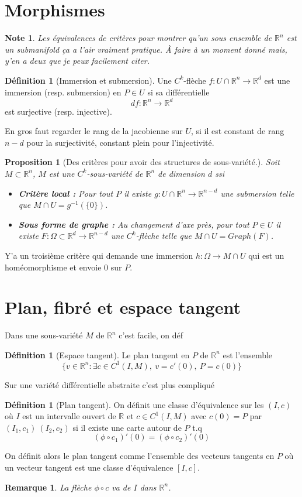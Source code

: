 \documentclass[a4paper,12pt]{book}
\newcommand{\R}{\mathbb{R}}
\theoremstyle{plain}
\newtheorem{prop}[subsection]{Proposition}
\newtheorem{rem}{Remarque}
\newtheorem{note}{Note}
\theoremstyle{definition}
\newtheorem{defn}[subsection]{Définition}
\theoremstyle{remark}
\begin{document}
\section{Morphismes}
\begin{note}
    Les équivalences de critères pour montrer qu'un sous ensemble de 
    $\R^n$ est un submanifold ça a l'air vraiment pratique. À faire
    à un moment donné mais, y'en a deux que je peux facilement 
    citer.
\end{note}
\begin{defn}[Immersion et submersion]
    Une $C^k$-flèche $f\colon U\cap \R^n\to \R^d$ est une immersion
    (resp. submersion) en $P\in U$ si sa différentielle 
    \[df\colon \R^n\to \R^d\]
    est surjective (resp. injective).
\end{defn}
En gros faut regarder le rang de la jacobienne sur $U$, si il est 
constant de rang $n-d$ pour la surjectivité, constant plein pour
l'injectivité.
\begin{prop}[Des critères pour avoir des structures de sous-variété.]
    Soit $M\subset \R^n$, $M$ est une $C^k$-sous-variété de $\R^n$
    de dimension $d$ ssi
    \begin{itemize}
        \item \textbf{Critère local :} Pour tout $P$ il existe
            $g\colon U\cap\R^n\to \R^{n-d}$ une submersion telle que 
            $M\cap U=g^{-1}(\{0\})$.
        \item \textbf{Sous forme de graphe :} Au changement d'axe près,
            pour tout $P\in U$ il existe 
            $F\colon \Omega\subset \R^d\to \R^{n-d}$ une 
            $C^k$-flèche telle que $M\cap U=Graph(F)$.
    \end{itemize}
\end{prop}
Y'a un troisième critère qui demande une immersion 
$h\colon \Omega\to M\cap U$ qui est un homéomorphisme et envoie $0$ sur 
$P$.

\section{Plan, fibré et espace tangent}
Dans une sous-variété $M$ de $\R^n$ c'est facile, on déf
\begin{defn}[Espace tangent]
    Le plan tangent en $P$ de $\R^n$ est l'ensemble 
    \[\{v\in\R^n : \exists c\in C^1(I,M),~v=c'(0),~P=c(0)\}\]
\end{defn}
Sur une variété différentielle abstraite c'est plus compliqué
\begin{defn}[Plan tangent]
    On définit une classe d'équivalence sur les $(I,c)$ où 
    $I$ est un intervalle ouvert de $\R$ et $c\in C^1(I,M)$ avec 
    $c(0)=P$ par $(I_1,c_1)~(I_2,c_2)$ si il existe une carte 
    autour de $P$ t.q 
    \[(\phi\circ c_1)'(0)=(\phi\circ c_2)'(0)\]

    On définit alors le plan tangent comme l'ensemble des vecteurs 
    tangents en $P$ où un vecteur tangent est une classe d'équivalence
    $[I,c]$.
\end{defn}
\begin{rem}
    La flèche $\phi\circ c$ va de $I$ dans $\R^n$.
\end{rem}
\end{document}
